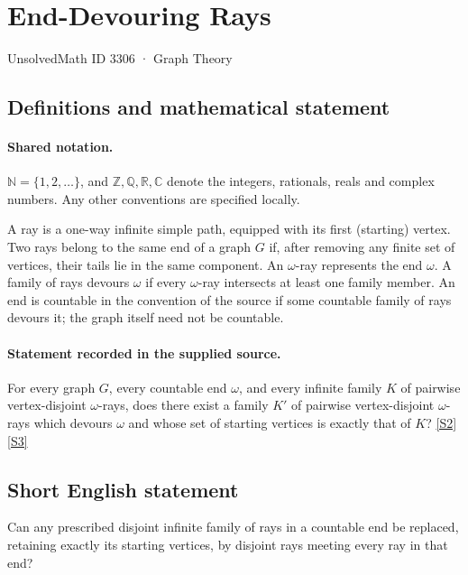 \documentclass[11pt]{article}
\newcommand{\sref}[2]{\hyperlink{source:#1:#2}{[S#2]}}
\begin{document}
\setcounter{section}{3305}
\section{End-Devouring Rays}\label{3306}
{\small\sffamily UnsolvedMath ID 3306 · Graph Theory}
\subsection{Definitions and mathematical statement}

\paragraph{Shared notation.}$\mathbb N=\{1,2,\ldots\}$, and $\mathbb Z,\mathbb Q,\mathbb R,\mathbb C$ denote the integers, rationals, reals and complex numbers. Any other conventions are specified locally.


A ray is a one-way infinite simple path, equipped with its first (starting) vertex. Two rays belong to the same end of a graph $G$ if, after removing any finite set of vertices, their tails lie in the same component. An $\omega$-ray represents the end $\omega$. A family of rays devours $\omega$ if every $\omega$-ray intersects at least one family member. An end is countable in the convention of the source if some countable family of rays devours it; the graph itself need not be countable.
\paragraph{Statement recorded in the supplied source.}
For every graph $G$, every countable end $\omega$, and every infinite family $K$ of pairwise vertex-disjoint $\omega$-rays, does there exist a family $K'$ of pairwise vertex-disjoint $\omega$-rays which devours $\omega$ and whose set of starting vertices is exactly that of $K$? \sref{3306}{2} \sref{3306}{3}
\subsection{Short English statement}
Can any prescribed disjoint infinite family of rays in a countable end be replaced, retaining exactly its starting vertices, by disjoint rays meeting every ray in that end?
\end{document}
